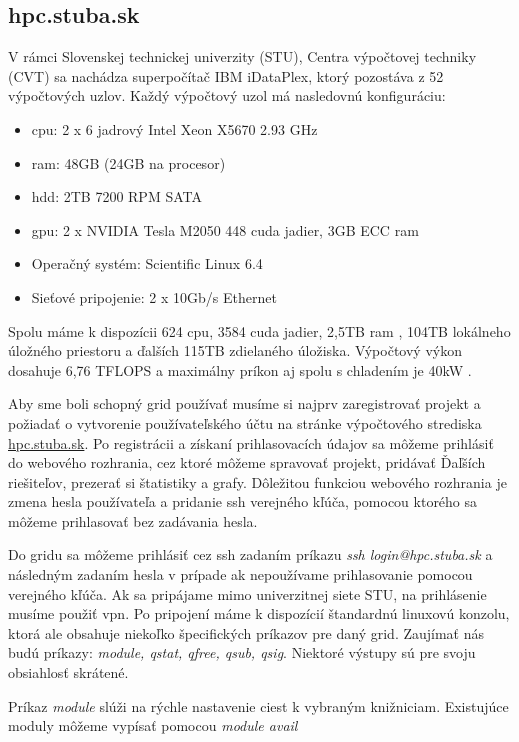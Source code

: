 \subsection{hpc.stuba.sk}
V rámci Slovenskej technickej univerzity (STU), Centra výpočtovej techniky (CVT) sa nachádza superpočítač IBM iDataPlex, ktorý pozostáva z 52 výpočtových uzlov.
Každý výpočtový uzol má nasledovnú konfiguráciu:
\begin{itemize}
\item \acrshort{cpu}: 2 x 6 jadrový Intel Xeon X5670 2.93 GHz
\item \acrshort{ram}: 48GB (24GB na procesor)
\item \acrshort{hdd}: 2TB 7200 RPM SATA
\item \acrshort{gpu}: 2 x NVIDIA Tesla M2050 448 cuda jadier, 3GB ECC \acrshort{ram}
\item Operačný systém: Scientific Linux 6.4
\item Sieťové pripojenie: 2 x 10Gb/s Ethernet
\end{itemize}
Spolu máme k dispozícii 624 \acrshort{cpu}, 3584 cuda jadier, 2,5TB \acrshort{ram} , 104TB lokálneho úložného priestoru a ďalších 115TB zdielaného úložiska.
Výpočtový výkon dosahuje 6,76 TFLOPS a maximálny príkon aj spolu s chladením je 40kW \cite{hpc}.

Aby sme boli schopný grid používať musíme si najprv zaregistrovať projekt a požiadať o vytvorenie
používateľského účtu na stránke výpočtového strediska \url{hpc.stuba.sk}.
Po registrácii a získaní prihlasovacích údajov sa môžeme prihlásiť do webového rozhrania, cez ktoré môžeme spravovať projekt,
pridávať Ďaľších riešiteľov, prezerať si štatistiky a grafy.
Dôležitou funkciou webového rozhrania je zmena hesla používateľa a pridanie \acrshort{ssh} verejného kľúča, pomocou ktorého sa môžeme prihlasovať bez zadávania hesla.

Do gridu sa môžeme prihlásiť cez \acrshort{ssh} zadaním príkazu \textit{ssh login@hpc.stuba.sk} a následným zadaním hesla v prípade ak nepoužívame prihlasovanie pomocou verejného kľúča.
Ak sa pripájame mimo univerzitnej siete STU, na prihlásenie musíme použiť \acrshort{vpn}.
Po pripojení máme k dispozícií štandardnú linuxovú konzolu, ktorá ale obsahuje niekoľko špecifických príkazov pre daný grid.
Zaujímať nás budú príkazy: \textit{module, qstat, qfree, qsub, qsig}. Niektoré výstupy sú pre svoju obsiahlosť skrátené.

Príkaz \textit{module} slúži na rýchle nastavenie ciest k vybraným knižniciam. Existujúce moduly môžeme vypísať pomocou \textit{module avail}

